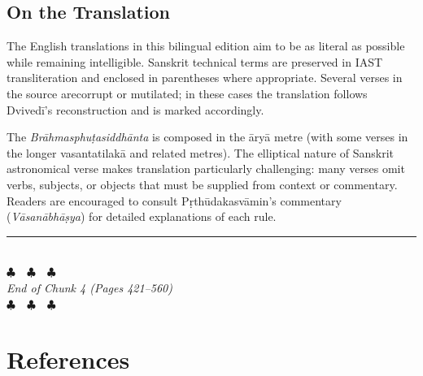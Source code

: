 \documentclass[11pt,a4paper]{article}
\newcommand{\longline}{\noindent\rule{\textwidth}{0.4pt}}
\begin{document}
\subsection*{On the Translation}

The English translations in this bilingual edition aim to be as literal as
possible while remaining intelligible. Sanskrit technical terms are preserved
in IAST transliteration and enclosed in parentheses where appropriate. Several
verses in the source arecorrupt or mutilated; in these cases the translation
follows Dvivedī's reconstruction and is marked accordingly.

The \textit{Brāhmasphuṭasiddhānta} is composed in the āryā metre (with some verses
in the longer vasantatilakā and related metres). The elliptical nature of Sanskrit
astronomical verse makes translation particularly challenging: many verses omit
verbs, subjects, or objects that must be supplied from context or commentary.
Readers are encouraged to consult Pṛthūdakasvāmin's commentary (\textit{Vāsanābhāṣya})
for detailed explanations of each rule.

\vspace{1cm}
\begin{center}
\longline\\[0.5cm]
{\Large\color{endmarkcolor}$\clubsuit$~~$\clubsuit$~~$\clubsuit$}\\[0.3cm]
\textit{End of Chunk 4 (Pages 421--560)}\\[0.3cm]
{\large\color{endmarkcolor}$\clubsuit$~~$\clubsuit$~~$\clubsuit$}
\end{center}

\newpage

\section*{References}
\end{document}
